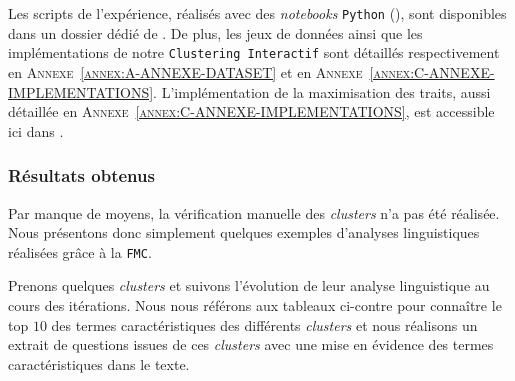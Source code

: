 			\begin{leftBarInformation}
				Les scripts de l'expérience, réalisés avec des \textit{notebooks} \texttt{Python} (\cite{van-rossum-drake:2009:python-reference-manual}), sont disponibles dans un dossier dédié de \cite{schild:2021:cognitivefactory-interactiveclusteringcomparativestudy}.
				De plus, les jeux de données ainsi que les implémentations de notre \texttt{Clustering Interactif} sont détaillés respectivement en \textsc{Annexe~\ref{annex:A-ANNEXE-DATASET}} et en \textsc{Annexe~\ref{annex:C-ANNEXE-IMPLEMENTATIONS}}.
				L'implémentation de la maximisation des traits, aussi détaillée en \textsc{Annexe~\ref{annex:C-ANNEXE-IMPLEMENTATIONS}}, est accessible ici dans \cite{schild:2023:cognitivefactory-featuresmaximizationmetric}.
			\end{leftBarInformation}

		\subsubsection{Résultats obtenus}
			
			\begin{leftBarWarning}
				Par manque de moyens, la vérification manuelle des \textit{clusters} n'a pas été réalisée.
				Nous présentons donc simplement quelques exemples d'analyses linguistiques réalisées grâce à la \texttt{FMC}.
			\end{leftBarWarning}
			
			Prenons quelques \textit{clusters} et suivons l'évolution de leur analyse linguistique au cours des itérations.
			Nous nous référons aux tableaux ci-contre pour connaître le top $10$ des termes caractéristiques des différents \textit{clusters} et nous réalisons un extrait de questions issues de ces \textit{clusters} avec une mise en évidence des termes caractéristiques dans le texte.
			
